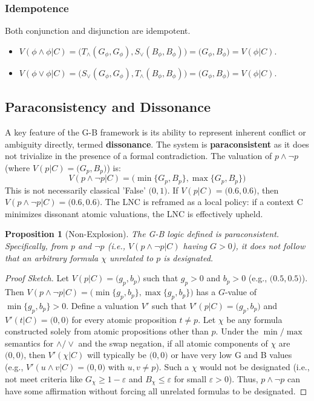\documentclass[11pt]{article}
\newcommand{\GB}[2]{\bigl(#1,#2\bigr)} %
\newtheorem{proposition}{Proposition}[section]
\theoremstyle{remark}
\begin{document}
\subsubsection{Idempotence}
Both conjunction and disjunction are idempotent.
\begin{itemize}
    \item $V(\phi \land \phi|C) = \GB{T_\wedge(G_\phi, G_\phi)}{S_\vee(B_\phi, B_\phi)} = \GB{G_\phi}{B_\phi} = V(\phi|C)$.
    \item $V(\phi \lor \phi|C) = \GB{S_\vee(G_\phi, G_\phi)}{T_\wedge(B_\phi, B_\phi)} = \GB{G_\phi}{B_\phi} = V(\phi|C)$.
\end{itemize}

\subsection{Paraconsistency and Dissonance} \label{sec:paraconsistency_main}
A key feature of the G-B framework is its ability to represent inherent conflict or ambiguity directly, termed \textbf{dissonance}. The system is \textbf{paraconsistent} as it does not trivialize in the presence of a formal contradiction. The valuation of $p \land \neg p$ (where $V(p|C) = \GB{G_p}{B_p}$) is:
$$V(p \land \neg p|C) = \GB{\min\{G_p, B_p\}}{\max\{G_p, B_p\}}$$
This is not necessarily classical 'False' $\GB{0}{1}$. If $V(p|C) = \GB{0.6}{0.6}$, then $V(p \land \neg p|C) = \GB{0.6}{0.6}$. The LNC is reframed as a local policy: if a context C minimizes dissonant atomic valuations, the LNC is effectively upheld.

\begin{proposition}[Non-Explosion] \label{prop:no_explosion}
The G-B logic defined is paraconsistent. Specifically, from $p$ and $\neg p$ (i.e., $V(p \land \neg p|C)$ having $G > 0$), it does not follow that an arbitrary formula $\chi$ unrelated to $p$ is designated.
\end{proposition}
\begin{proof}[Proof Sketch]
Let $V(p|C) = \GB{g_p}{b_p}$ such that $g_p > 0$ and $b_p > 0$ (e.g., $\GB{0.5}{0.5}$). Then $V(p \land \neg p|C) = \GB{\min\{g_p,b_p\}}{\max\{g_p,b_p\}}$ has a $G$-value of $\min\{g_p,b_p\} > 0$.
Define a valuation $V'$ such that $V'(p|C) = \GB{g_p}{b_p}$ and $V'(t|C)=\GB{0}{0}$ for every atomic proposition $t \neq p$.
Let $\chi$ be any formula constructed solely from atomic propositions other than $p$. Under the $\min/\max$ semantics for $\land/\lor$ and the swap negation, if all atomic components of $\chi$ are $\GB{0}{0}$, then $V'(\chi|C)$ will typically be $\GB{0}{0}$ or have very low G and B values (e.g., $V'(u \land v|C)=\GB{0}{0}$ with $u,v \neq p$).
Such a $\chi$ would not be designated (i.e., not meet criteria like $G_\chi \ge 1-\varepsilon$ and $B_\chi \le \varepsilon$ for small $\varepsilon > 0$).
Thus, $p \land \neg p$ can have some affirmation without forcing all unrelated formulas to be designated.
\end{proof}
\end{document}

